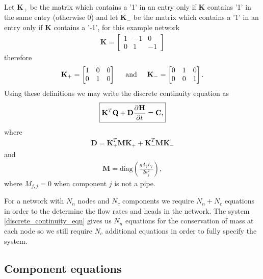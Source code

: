 Let $\mathbf{K}_+$ be the matrix which contains a '1' in an entry only if $\mathbf{K}$ contains '1' in the same entry (otherwise 0) and let $\mathbf{K}_-$ be the matrix which contains a '1' in an entry only if $\mathbf{K}$ contains a '-1', for this example network 
\begin{align*}
\mathbf{K} = \begin{bmatrix}
1 & -1 & 0 \\
0 & 1 & -1
\end{bmatrix}
\end{align*}
therefore
\begin{align*}
\mathbf{K}_+ = \begin{bmatrix}
1 & 0 & 0 \\
0 & 1 & 0
\end{bmatrix}
\hspace{0.5cm} \text{and} \hspace{0.5cm} \mathbf{K}_- = \begin{bmatrix}
0 & 1 & 0 \\
0 & 0 & 1
\end{bmatrix}.
\end{align*}
Using these definitions we may write the discrete continuity equation as 
\begin{align}\label{discrete_continuity_eqn}
\boxed{\mathbf{K}^T \mathbf{Q} + \mathbf{D} \frac{\partial^{} \mathbf{H}}{\partial t^{}} = \mathbf{C},}
\end{align}
where 
\begin{align*}
\mathbf{D} = \mathbf{K}_+^T \mathbf{M} \mathbf{K}_+ + \mathbf{K}_-^T \mathbf{M} \mathbf{K}_-
\end{align*}
and
\begin{align*}
\mathbf{M} = \text{diag}\left( \frac{gA_j L_j}{2 a_j^2}\right),
\end{align*}
{\color{red}where $M_{j,j} = 0$ when component $j$ is not a pipe.}

For a network with $N_n$ nodes and $N_c$ components we require $N_n + N_c$ equations in order to the determine the flow rates and heads in the network. The system \eqref{discrete_continuity_eqn} gives us $N_n$ equations for the conservation of mass at each node so we still require $N_c$ additional equations in order to fully specify the system. 

\subsection{Component equations}

